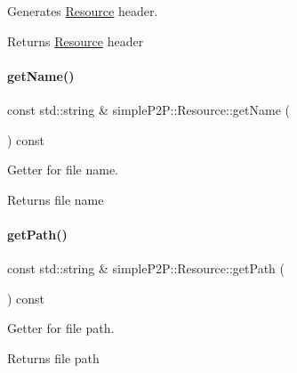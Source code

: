 Generates \hyperlink{classsimpleP2P_1_1Resource}{Resource} header. 

\begin{DoxyReturn}{Returns}
\hyperlink{classsimpleP2P_1_1Resource}{Resource} header 
\end{DoxyReturn}
\mbox{\label{classsimpleP2P_1_1Resource_adc12496aedf1729852d2c98bf94428aa}} 
\paragraph{\texorpdfstring{get\+Name()}{getName()}}
{\footnotesize\ttfamily const std\+::string \& simple\+P2\+P\+::\+Resource\+::get\+Name (\begin{DoxyParamCaption}{ }\end{DoxyParamCaption}) const}



Getter for file name. 

\begin{DoxyReturn}{Returns}
file name 
\end{DoxyReturn}
\mbox{\label{classsimpleP2P_1_1Resource_a866cdd2e717abf3515629ca73b2f80b8}} 
\paragraph{\texorpdfstring{get\+Path()}{getPath()}}
{\footnotesize\ttfamily const std\+::string \& simple\+P2\+P\+::\+Resource\+::get\+Path (\begin{DoxyParamCaption}{ }\end{DoxyParamCaption}) const}



Getter for file path. 

\begin{DoxyReturn}{Returns}
file path 
\end{DoxyReturn}
\mbox{\label{classsimpleP2P_1_1Resource_adadeb491cccabbce2e1d883f9e8519f7}} 
